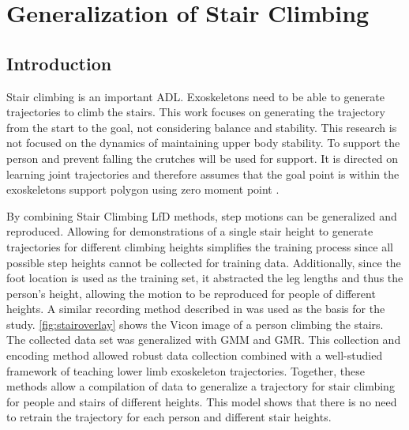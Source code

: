 \chapter{Generalization of Stair Climbing}

\section{Introduction}
Stair climbing is an important ADL. Exoskeletons need to be able to generate trajectories to climb the stairs. This work focuses on generating the trajectory from the start to the goal, not considering balance and stability. This research is not focused on the dynamics of maintaining upper body stability. To support the person and prevent falling the crutches will be used for support. It is directed on learning joint trajectories and therefore assumes that the goal point is within the exoskeletons support polygon using zero moment point \cite{kajita2003biped}. 


By combining Stair Climbing LfD methods, step motions can be generalized and reproduced. Allowing for demonstrations of a single stair height to generate trajectories for different climbing heights simplifies the training process since all possible step heights cannot be collected for training data. Additionally, since the foot location is used as the training set, it abstracted the leg lengths and thus the person's height, allowing the motion to be reproduced for people of different heights. A similar recording method described in \cite{hicks2011lower} was used as the basis for the study. \autoref{fig:stairoverlay} shows the Vicon image of a person climbing the stairs. The collected data set was generalized with GMM and GMR. This collection and encoding method allowed robust data collection combined with a well-studied framework of teaching lower limb exoskeleton trajectories. Together, these methods allow a compilation of data to generalize a trajectory for stair climbing for people and stairs of different heights. This model shows that there is no need to retrain the trajectory for each person and different stair heights.



